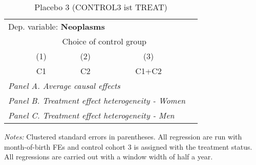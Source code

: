  \begin{table}[H] \centering \begin{threeparttable} \caption{Placebo 3 (CONTROL3 ist TREAT) } {\def\sym#1{\ifmmode^{#1}\else\(^{#1}\)\fi} \begin{tabular}{l*{4}{c}} \toprule \multicolumn{4}{l}{Dep. variable: \textbf{Neoplasms}} \\ & \multicolumn{3}{c}{Choice of control group} \\ \cmidrule(lr){2-4}
            &\multicolumn{1}{c}{(1)}&\multicolumn{1}{c}{(2)}&\multicolumn{1}{c}{(3)}\\
            &\multicolumn{1}{c}{C1}&\multicolumn{1}{c}{C2}&\multicolumn{1}{c}{C1+C2}\\
\midrule
 \multicolumn{4}{l}{\emph{Panel A. Average causal effects}} \\      \midrule\multicolumn{4}{l}{\emph{Panel B. Treatment effect heterogeneity - Women}} \\      \midrule\multicolumn{4}{l}{\emph{Panel C. Treatment effect heterogeneity - Men}} \\      
\bottomrule \end{tabular} } \begin{tablenotes} \item \scriptsize \emph{Notes:} Clustered standard errors in parentheses. All regression are run with month-of-birth FEs and control cohort 3 is assigned with the treatment status. All regressions are carried out with a window width of half a year. \end{tablenotes} \end{threeparttable} \end{table} 
